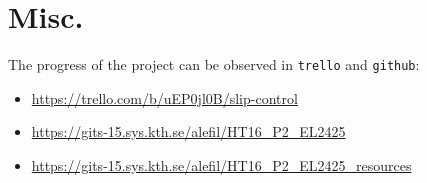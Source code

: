 \documentclass[oneside,12pt]{article}
\begin{document}

\section{Misc.}

The progress of the project can be observed in \texttt{trello} and \texttt{github}:

\begin{itemize}
  \item \url{https://trello.com/b/uEP0jl0B/slip-control}
  \item \url{https://gits-15.sys.kth.se/alefil/HT16_P2_EL2425}
  \item \url{https://gits-15.sys.kth.se/alefil/HT16_P2_EL2425_resources}
\end{itemize}
\end{document}
